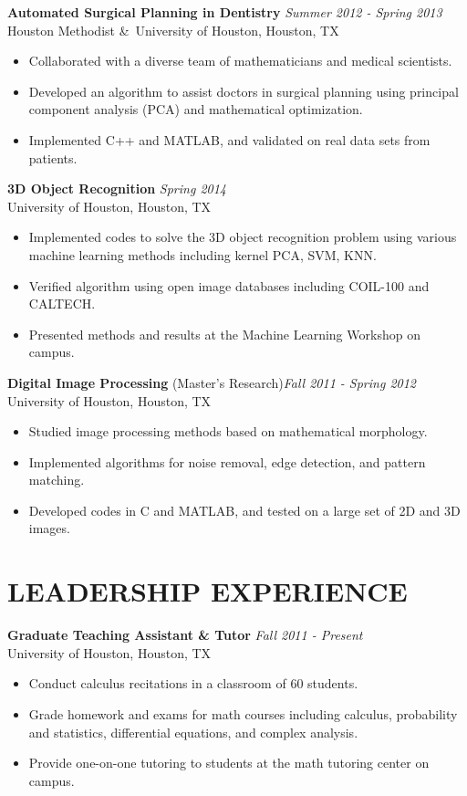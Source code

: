 \documentclass[margin,line,10pt]{res} %
\begin{document}
\begin{resume}
{\bf Automated Surgical Planning in Dentistry} \hfill {\em Summer 2012 - Spring 2013} \\
Houston Methodist \&\ University of Houston, Houston, TX
\begin{itemize}[leftmargin=12pt] \itemsep -2pt
\item Collaborated with a diverse team of mathematicians and medical scientists.
\item Developed an algorithm to assist doctors in surgical planning using principal component analysis (PCA) and mathematical optimization.
\item Implemented C++ and MATLAB, and validated on real data sets from patients.
\end{itemize}

\textbf{3D Object Recognition} \hfill {\em Spring 2014} \\
University of Houston, Houston, TX
\begin{itemize}[leftmargin=12pt] \itemsep -2pt
\item Implemented codes to solve the 3D object recognition problem using various machine learning methods including kernel PCA, SVM, KNN.
\item Verified algorithm using open image databases including COIL-100 and CALTECH.
\item Presented methods and results at the Machine Learning Workshop on campus.
\end{itemize}

\newpage
{\bf Digital Image Processing} (Master's Research)\hfill {\em Fall 2011 - Spring 2012} \\
University of Houston, Houston, TX
\begin{itemize}[leftmargin=12pt] \itemsep -2pt
\item Studied image processing methods based on mathematical morphology.
\item Implemented algorithms for noise removal, edge detection, and pattern matching.
\item Developed codes in C and MATLAB, and tested on a large set of 2D and 3D images.
\end{itemize}

\section{LEADERSHIP EXPERIENCE}

{\bf Graduate Teaching Assistant \& Tutor} \hfill {\em Fall 2011 - Present} \\
University of Houston, Houston, TX
\begin{itemize}[leftmargin=12pt] \itemsep -2pt %
\item Conduct calculus recitations in a classroom of 60 students.
\item Grade homework and exams for math courses including calculus, probability and statistics, differential equations, and complex analysis.
\item Provide one-on-one tutoring to students at the math tutoring center on campus.
\end{itemize}


\end{resume}
\end{document}
